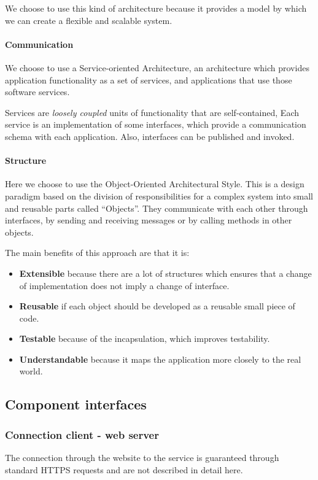 We choose to use this kind of architecture because it provides a model by which
we can create a flexible and scalable system.

\paragraph{Communication} We choose to use a Service-oriented Architecture, 
an architecture which provides application functionality as a set of services, 
and applications that use those software services. 

Services are \textit{loosely coupled} units of functionality that are self-contained, 
Each service is an implementation of some interfaces, which provide a communication schema with
each application. Also, interfaces can be published and invoked.

\paragraph{Structure} Here we choose to use the Object-Oriented Architectural Style.
This is a design paradigm based on the division of responsibilities for a complex system
into small and reusable parts called ``Objects''.
They communicate with each other through interfaces, by sending and receiving messages
or by calling methods in other objects.

The main benefits of this approach are that it is:

\begin{itemize}
    \item{\textbf{Extensible} because there are a lot of structures which ensures that a change of implementation does not imply a change of interface.}
    \item{\textbf{Reusable} if each object should be developed as a reusable small piece of code.}
    \item{\textbf{Testable} because of the incapsulation, which improves testability.}
    \item{\textbf{Understandable} because it maps the application more closely to the real world.}
\end{itemize}

\pagebreak
\subsection{Component interfaces}
\label{sub:component_interfaces}

\subsubsection{Connection client - web server} %
\label{ssub:https}
The connection through the website to the service is guaranteed through standard HTTPS requests and are not described in detail here.

